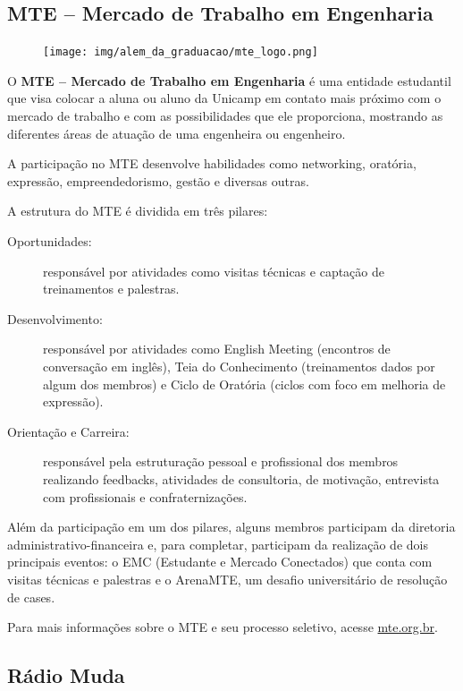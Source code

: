 \subsection{MTE -- Mercado de Trabalho em Engenharia}

\begin{figure}[h!]
  \centering
  \texttt{[image: img/alem\_da\_graduacao/mte\_logo.png]}
\end{figure}

O \textbf{MTE -- Mercado de Trabalho em Engenharia} é uma entidade estudantil
que visa colocar a aluna ou aluno da Unicamp em contato mais próximo com o
mercado de trabalho e com as possibilidades que ele proporciona, mostrando as
diferentes áreas de atuação de uma engenheira ou engenheiro.

A participação no MTE desenvolve habilidades como networking, oratória,
expressão, empreendedorismo, gestão e diversas outras.

A estrutura do MTE é dividida em três pilares:

\begin{description}
\item[Oportunidades:] responsável por atividades co\-mo visitas técnicas e
  captação de treinamentos e palestras.

\item[Desenvolvimento:] responsável por atividades co\-mo English Meeting
  (encontros de conversação em inglês), Teia do Conhecimento (treinamentos
  dados por algum dos membros) e Ciclo de Oratória (ciclos com foco em melhoria
  de expressão).

\item[Orientação e Carreira:] responsável pela estruturação pessoal e
  profissional dos membros realizando feedbacks, atividades de consultoria, de
  motivação, entrevista com profissionais e confraternizações.
\end{description}

Além da participação em um dos pilares, alguns membros participam da diretoria
administrativo-financeira e, para completar, participam da realização de dois
principais eventos: o EMC (Estudante e Mercado Conectados) que conta com
visitas técnicas e palestras e o ArenaMTE, um desafio universitário de
resolução de cases.

Para mais informações sobre o MTE e seu processo seletivo, acesse
\url{mte.org.br}.

\subsection{Rádio Muda}

